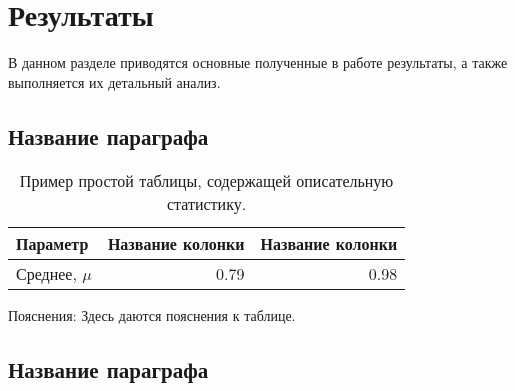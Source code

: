 \section{Результаты}
\label{sec:Results}

В данном разделе приводятся основные полученные в работе результаты, а также выполняется их детальный анализ.

\subsection{Название параграфа}
\label{sec:}

\begin{table*}[!h]
\caption{Пример простой таблицы, содержащей описательную статистику.}
\label{tab:tab_descr_1}
\setlength{\arrayrulewidth}{1.05 pt}
\renewcommand{\arraystretch}{1.1}
\begin{tabular*}{1.0\textwidth}{@{\extracolsep{\fill}}lrr}
\hline
Параметр & Название колонки & Название колонки \\
\hline
Среднее, $\mu$ & 0.79 & 0.98 \\
\hline
\end{tabular*}
\begin{spacing}{0.5}
{\scriptsize Пояснения: Здесь даются пояснения к таблице.}
\end{spacing}
\end{table*}

\subsection{Название параграфа}
\label{sec:}

